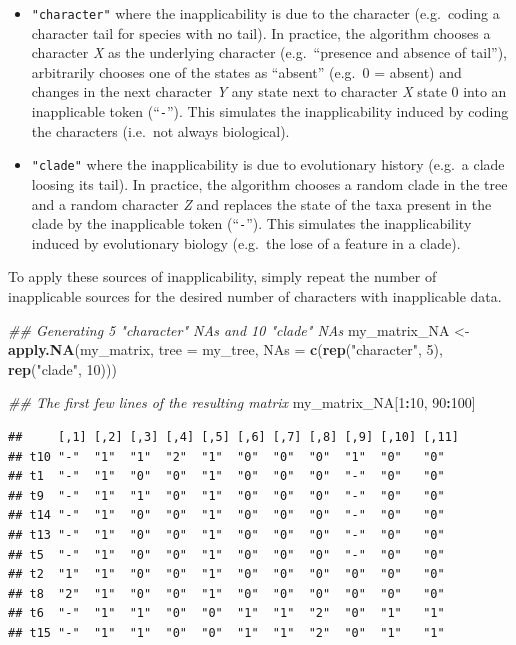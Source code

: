 \documentclass[
]{book}
\newenvironment{Shaded}{\begin{snugshade}}{\end{snugshade}}
\newcommand{\CommentTok}[1]{\textcolor[rgb]{0.56,0.35,0.01}{\textit{#1}}}
\newcommand{\DataTypeTok}[1]{\textcolor[rgb]{0.13,0.29,0.53}{#1}}
\newcommand{\DecValTok}[1]{\textcolor[rgb]{0.00,0.00,0.81}{#1}}
\newcommand{\KeywordTok}[1]{\textcolor[rgb]{0.13,0.29,0.53}{\textbf{#1}}}
\newcommand{\NormalTok}[1]{#1}
\newcommand{\OperatorTok}[1]{\textcolor[rgb]{0.81,0.36,0.00}{\textbf{#1}}}
\newcommand{\StringTok}[1]{\textcolor[rgb]{0.31,0.60,0.02}{#1}}
\providecommand{\tightlist}{%
  \setlength{\itemsep}{0pt}\setlength{\parskip}{0pt}}
\begin{document}
\begin{itemize}
\tightlist
\item
  \texttt{"character"} where the inapplicability is due to the character (e.g.~coding a character tail for species with no tail).
  In practice, the algorithm chooses a character \emph{X} as the underlying character (e.g.~``presence and absence of tail''), arbitrarily chooses one of the states as ``absent'' (e.g.~0 = absent) and changes in the next character \emph{Y} any state next to character \emph{X} state 0 into an inapplicable token (``\texttt{-}'').
  This simulates the inapplicability induced by coding the characters (i.e.~not always biological).
\item
  \texttt{"clade"} where the inapplicability is due to evolutionary history (e.g.~a clade loosing its tail).
  In practice, the algorithm chooses a random clade in the tree and a random character \emph{Z} and replaces the state of the taxa present in the clade by the inapplicable token (``\texttt{-}'').
  This simulates the inapplicability induced by evolutionary biology (e.g.~the lose of a feature in a clade).
\end{itemize}

To apply these sources of inapplicability, simply repeat the number of inapplicable sources for the desired number of characters with inapplicable data.

\begin{Shaded}
\begin{Highlighting}[]
\CommentTok{\#\# Generating 5 "character" NAs and 10 "clade" NAs}
\NormalTok{my\_matrix\_NA \textless{}{-}}\StringTok{ }\KeywordTok{apply.NA}\NormalTok{(my\_matrix, }\DataTypeTok{tree =}\NormalTok{ my\_tree,}
                         \DataTypeTok{NAs =} \KeywordTok{c}\NormalTok{(}\KeywordTok{rep}\NormalTok{(}\StringTok{"character"}\NormalTok{, }\DecValTok{5}\NormalTok{),}
                                 \KeywordTok{rep}\NormalTok{(}\StringTok{"clade"}\NormalTok{, }\DecValTok{10}\NormalTok{)))}

\CommentTok{\#\# The first few lines of the resulting matrix}
\NormalTok{my\_matrix\_NA[}\DecValTok{1}\OperatorTok{:}\DecValTok{10}\NormalTok{, }\DecValTok{90}\OperatorTok{:}\DecValTok{100}\NormalTok{]}
\end{Highlighting}
\end{Shaded}

\begin{verbatim}
##     [,1] [,2] [,3] [,4] [,5] [,6] [,7] [,8] [,9] [,10] [,11]
## t10 "-"  "1"  "1"  "2"  "1"  "0"  "0"  "0"  "1"  "0"   "0"  
## t1  "-"  "1"  "0"  "0"  "1"  "0"  "0"  "0"  "-"  "0"   "0"  
## t9  "-"  "1"  "1"  "0"  "1"  "0"  "0"  "0"  "-"  "0"   "0"  
## t14 "-"  "1"  "0"  "0"  "1"  "0"  "0"  "0"  "-"  "0"   "0"  
## t13 "-"  "1"  "0"  "0"  "1"  "0"  "0"  "0"  "-"  "0"   "0"  
## t5  "-"  "1"  "0"  "0"  "1"  "0"  "0"  "0"  "-"  "0"   "0"  
## t2  "1"  "1"  "0"  "0"  "1"  "0"  "0"  "0"  "0"  "0"   "0"  
## t8  "2"  "1"  "0"  "0"  "1"  "0"  "0"  "0"  "0"  "0"   "0"  
## t6  "-"  "1"  "1"  "0"  "0"  "1"  "1"  "2"  "0"  "1"   "1"  
## t15 "-"  "1"  "1"  "0"  "0"  "1"  "1"  "2"  "0"  "1"   "1"
\end{verbatim}
\end{document}
